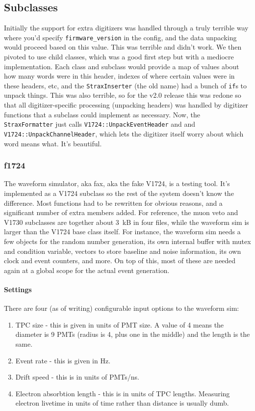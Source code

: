 \subsection{Subclasses}

Initially the support for extra digitizers was handled through a truly terrible way where you'd specify \texttt{firmware\_version} in the config, and the data unpacking would proceed based on this value.
This was terrible and didn't work.
We then pivoted to use child classes, which was a good first step but with a mediocre implementation.
Each class and subclass would provide a map of values about how many words were in this header, indexes of where certain values were in these headers, etc, and the \texttt{StraxInserter} (the old name) had a bunch of \texttt{if}s to unpack things.
This was also terrible, so for the v2.0 release this was redone so that all digitizer-specific processing (unpacking headers) was handled by digitizer functions that a subclass could implement as necessary.
Now, the \texttt{StraxFormatter} just calls \texttt{V1724::UnpackEventHeader} and and \texttt{V1724::UnpackChannelHeader}, which lets the digitizer itself worry about which word means what.
It's beautiful.

\subsubsection{f1724}

The waveform simulator, aka fax, aka the fake V1724, is a testing tool.
It's implemented as a V1724 subclass so the rest of the system doesn't know the difference.
Most functions had to be rewritten for obvious reasons, and a significant number of extra members added.
For reference, the muon veto and V1730 subclasses are together about 3~kB in four files, while the waveform sim is larger than the V1724 base class itself.
For instance, the waveform sim needs a few objects for the random number generation, its own internal buffer with mutex and condition variable, vectors to store baseline and noise information, its own clock and event counters, and more.
On top of this, most of these are needed again at a global scope for the actual event generation.

\paragraph{Settings}

There are four (as of writing) configurable input options to the waveform sim:
\begin{enumerate}
  \item TPC size - this is given in units of PMT size. A value of 4 means the diameter is 9 PMTs (radius is 4, plus one in the middle) and the length is the same.
  \item Event rate - this is given in Hz.
  \item Drift speed - this is in units of PMTs/ns.
  \item Electron absorbtion length - this is in units of TPC lengths. Measuring electron livetime in units of time rather than distance is usually dumb.
\end{enumerate}

